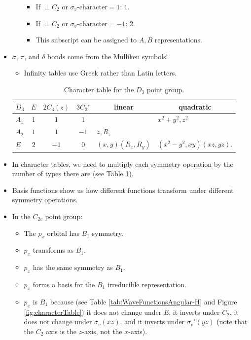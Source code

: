 \documentclass[../notes.tex]{subfiles}
\begin{document}
\begin{itemize}
\begin{itemize}
\begin{itemize}
            \item If $\perp C_2\text{ or }\sigma_v\text{-character}=1$: $1$.
            \item If $\perp C_2\text{ or }\sigma_v\text{-character}=-1$: $2$.
            \item This subscript can be assigned to $A,B$ representations.
        \end{itemize}
    \end{itemize}
    \item $\sigma$, $\pi$, and $\delta$ bonds come from the Mulliken symbols!
    \begin{itemize}
        \item Infinity tables use Greek rather than Latin letters.
    \end{itemize}
    \begin{table}[h!]
        \centering
        \renewcommand{\arraystretch}{1.2}
        \small
        \begin{tabular}{l|ccc|l|l}
            $D_3$ & $E$ & $2C_3(z)$ & $3C_2'$ & \multicolumn{1}{c|}{linear} & \multicolumn{1}{c}{quadratic}\\
            \hline
            $A_1$ & $1$ & $1$ & $1$ & & $x^2+y^2,z^2$\\
            $A_2$ & $1$ & $1$ & $-1$ & $z,R_z$ & \\
            $E$ & $2$ & $-1$ & $0$ & $(x,y)(R_x,R_y)$ & $(x^2-y^2,xy)(xz,yz)$.
        \end{tabular}
        \caption{Character table for the $D_3$ point group.}
        \label{tab:characterTable-D3}
    \end{table}
    \item In character tables, we need to multiply each symmetry operation by the number of types there are (see Table \ref{tab:characterTable-D3}).
    \item Basis functions show us how different functions transform under different symmetry operations.
    \item In the $C_{2v}$ point group:
    \begin{itemize}
        \item The $p_x$ orbital has $B_1$ symmetry.
        \item $p_x$ transforms as $B_1$.
        \item $p_x$ has the same symmetry as $B_1$.
        \item $p_x$ forms a basis for the $B_1$ irreducible representation.
        \item $p_x$ is $B_1$ because (see Table \ref{tab:WaveFunctionsAngular-H} and Figure \ref{fig:characterTable}) it does not change under $E$, it inverts under $C_2$, it does not change under $\sigma_v(xz)$, and it inverts under $\sigma_v'(yz)$ (note that the $C_2$ axis is the $z$-axis, not the $x$-axis).

\end{itemize}
\end{itemize}
\end{document}
